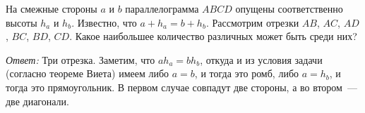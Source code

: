 \problem
На смежные стороны $a$ и $b$ параллелограмма $ABCD$ опущены соответственно
высоты $h_a$ и $h_b$.
Известно, что $a + h_a = b + h_b$.
Рассмотрим отрезки $AB$, $AC$, $AD$, $BC$, $BD$, $CD$.
Какое наибольшее количество различных может быть среди них?


\solution
\label{solution:2011/regatta/junior/geomt/4}%
\emph{Ответ:} Три отрезка.
Заметим, что $a h_a = b h_b$, откуда и из условия задачи
(согласно теореме Виета) имеем либо $a = b$, и тогда это ромб, либо $a = h_b$,
и тогда это прямоугольник.
В первом случае совпадут две стороны, а во втором~--- две диагонали.

\endproblem
